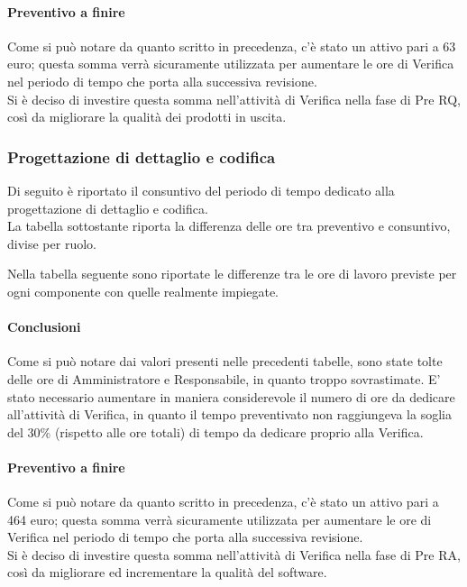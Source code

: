 \paragraph{Preventivo a finire}
Come si può notare da quanto scritto in precedenza, c'è stato un attivo pari a 63 euro; questa somma verrà sicuramente utilizzata per aumentare le ore di Verifica nel periodo di tempo che porta alla successiva revisione.\\
Si è deciso di investire questa somma nell'attività di Verifica nella fase di Pre RQ, così da migliorare la qualità dei prodotti in uscita.

\subsubsection{Progettazione di dettaglio e codifica}
Di seguito è riportato il consuntivo del periodo di tempo dedicato alla progettazione di dettaglio e codifica.\\
La tabella sottostante riporta la differenza delle ore tra preventivo e consuntivo, divise per ruolo.


Nella tabella seguente sono riportate le differenze tra le ore di lavoro previste per ogni componente con quelle realmente impiegate.


\paragraph{Conclusioni}
Come si può notare dai valori presenti nelle precedenti tabelle, sono state tolte delle ore di Amministratore e Responsabile, in quanto troppo sovrastimate. E' stato necessario aumentare in maniera considerevole il numero di ore da dedicare all'attività di Verifica, in quanto il tempo preventivato non raggiungeva la soglia del 30\% (rispetto alle ore totali) di tempo da dedicare proprio alla Verifica.
\paragraph{Preventivo a finire}
Come si può notare da quanto scritto in precedenza, c'è stato un attivo pari a 464 euro; questa somma verrà sicuramente utilizzata per aumentare le ore di Verifica nel periodo di tempo che porta alla successiva revisione.\\
Si è deciso di investire questa somma nell'attività di Verifica nella fase di Pre RA, così da migliorare ed incrementare la qualità del software.